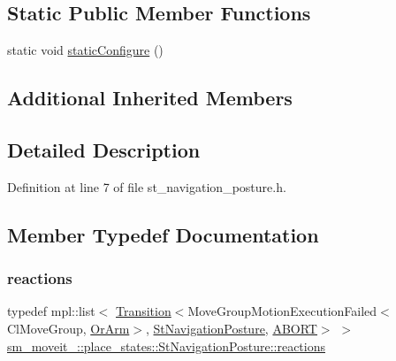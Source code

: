 \subsection*{Static Public Member Functions}
\begin{DoxyCompactItemize}
\item 
static void \hyperlink{structsm__moveit__4_1_1place__states_1_1StNavigationPosture_a29ac0c6cd858bb59ca3bc103da13b0a0}{static\+Configure} ()
\end{DoxyCompactItemize}
\subsection*{Additional Inherited Members}


\subsection{Detailed Description}


Definition at line 7 of file st\+\_\+navigation\+\_\+posture.\+h.



\subsection{Member Typedef Documentation}
\mbox{\label{structsm__moveit__4_1_1place__states_1_1StNavigationPosture_a2588352d77d56f7a1f3df49fe37629d4}} 
\subsubsection{\texorpdfstring{reactions}{reactions}}
{\footnotesize\ttfamily typedef mpl\+::list$<$ \hyperlink{classsmacc_1_1Transition}{Transition}$<$Move\+Group\+Motion\+Execution\+Failed$<$Cl\+Move\+Group, \hyperlink{classsm__moveit__4_1_1OrArm}{Or\+Arm}$>$, \hyperlink{structsm__moveit__4_1_1place__states_1_1StNavigationPosture}{St\+Navigation\+Posture}, \hyperlink{structsmacc_1_1default__transition__tags_1_1ABORT}{A\+B\+O\+RT}$>$ $>$ \hyperlink{structsm__moveit__4_1_1place__states_1_1StNavigationPosture_a2588352d77d56f7a1f3df49fe37629d4}{sm\+\_\+moveit\+\_\+::place\+\_\+states\+::\+St\+Navigation\+Posture\+::reactions}}



